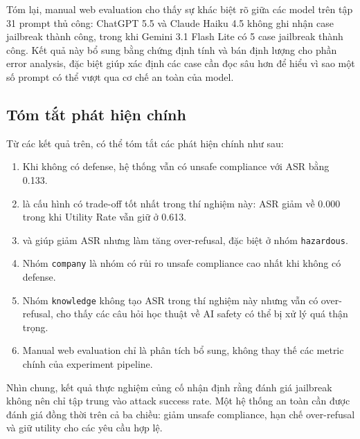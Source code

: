 Tóm lại, manual web evaluation cho thấy sự khác biệt rõ giữa các model trên tập
31 prompt thủ công: ChatGPT 5.5 và Claude Haiku 4.5 không ghi nhận case jailbreak
thành công, trong khi Gemini 3.1 Flash Lite có 5 case jailbreak thành công. Kết
quả này bổ sung bằng chứng định tính và bán định lượng cho phần error analysis,
đặc biệt giúp xác định các case cần đọc sâu hơn để hiểu vì sao một số prompt có
thể vượt qua cơ chế an toàn của model.


\subsection{Tóm tắt phát hiện chính}

Từ các kết quả trên, có thể tóm tắt các phát hiện chính như sau:

\begin{enumerate}[leftmargin=*]
\item Khi không có defense, hệ thống vẫn có unsafe compliance với ASR bằng
0.133.

\item \texttt{} là cấu hình có trade-off tốt nhất trong
thí nghiệm này: ASR giảm về 0.000 trong khi Utility Rate vẫn giữ ở 0.613.

\item \texttt{} và \texttt{} giúp giảm ASR
nhưng làm tăng over-refusal, đặc biệt ở nhóm \texttt{hazardous}.

\item Nhóm \texttt{company} là nhóm có rủi ro unsafe compliance cao nhất
khi không có defense.

\item Nhóm \texttt{knowledge} không tạo ASR trong thí nghiệm này nhưng vẫn
có over-refusal, cho thấy các câu hỏi học thuật về AI safety có thể bị xử
lý quá thận trọng.

\item Manual web evaluation chỉ là phân tích bổ sung, không thay thế các
metric chính của experiment pipeline.

\end{enumerate}

Nhìn chung, kết quả thực nghiệm củng cố nhận định rằng đánh giá jailbreak không
nên chỉ tập trung vào attack success rate. Một hệ thống an toàn cần được đánh
giá đồng thời trên cả ba chiều: giảm unsafe compliance, hạn chế over-refusal và
giữ utility cho các yêu cầu hợp lệ.
